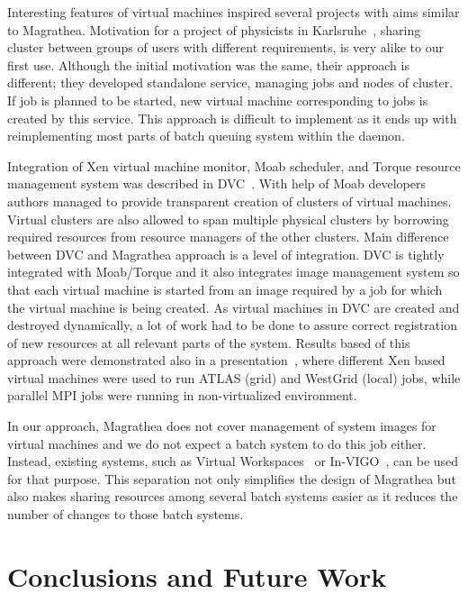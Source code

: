 \documentclass[a4paper]{article}
\begin{document}
Interesting features of virtual machines inspired several projects with aims
similar to Magrathea. Motivation for a project of physicists in
Karlsruhe~\cite{karlsruhe}, sharing cluster between groups of users with
different requirements, is very alike to our first use. Although the initial
motivation was the same, their approach is different; they developed
standalone service, managing jobs and nodes of cluster.  If job is planned to
be started, new virtual machine corresponding to jobs is created by this
service. This approach is difficult to implement as it ends up with
reimplementing most parts of batch queuing system within the daemon. 

Integration of Xen virtual machine monitor, Moab scheduler, and Torque
resource management system was described in DVC~\cite{dvc}. With help of Moab
developers authors managed to provide transparent creation of clusters of
virtual machines. Virtual clusters are also allowed to span multiple physical
clusters by borrowing required resources from resource managers of the other
clusters. Main difference between DVC and Magrathea approach is a level of
integration. DVC is tightly integrated with Moab/Torque and it also integrates
image management system so that each virtual machine is started from an image
required by a job for which the virtual machine is being created. As virtual
machines in DVC are created and destroyed dynamically, a lot of work had to be
done to assure correct registration of new resources at all relevant parts of
the system. Results based of this approach were demonstrated also in a
presentation~\cite{chep07}, where different Xen based virtual machines were
used to run ATLAS (grid) and WestGrid (local) jobs, while parallel MPI jobs
were running in non-virtualized environment.

In our approach, Magrathea does not cover management of system images for
virtual machines and we do not expect a batch system to do this job either.
Instead, existing systems, such as Virtual Workspaces~\cite{workspaces} or
In-VIGO~\cite{invigo}, can be used for that purpose. This separation not only
simplifies the design of Magrathea but also makes sharing resources among
several batch systems easier as it reduces the number of changes to those
batch systems.


\section{Conclusions and Future Work}
\end{document}

